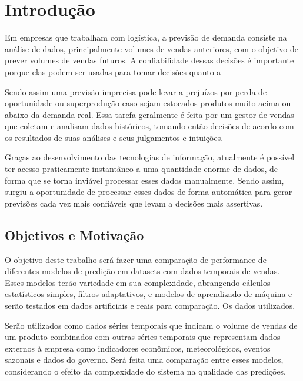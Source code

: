 
\chapter[Introdução]{Introdução}

Em empresas que trabalham com logística, a previsão de demanda consiste na análise de dados, principalmente volumes de vendas anteriores, com o objetivo de prever volumes de vendas futuros. A confiabilidade dessas decisões é importante porque elas podem ser usadas para tomar decisões quanto a 

Sendo assim uma previsão imprecisa pode levar a prejuízos por perda de oportunidade ou superprodução caso sejam estocados produtos muito acima ou abaixo da demanda real. Essa tarefa geralmente é feita por um gestor de vendas que coletam e analisam dados históricos, tomando então decisões de acordo com os resultados de suas análises e seus julgamentos e intuições.

Graças ao desenvolvimento das tecnologias de informação, atualmente é possível ter acesso praticamente instantâneo a uma quantidade enorme de dados, de forma que se torna inviável processar esses dados manualmente. Sendo assim, surgiu a oportunidade de processar esses dados de forma automática para gerar previsões cada vez mais confiáveis que levam a decisões mais assertivas.

\section{Objetivos e Motivação}

O objetivo deste trabalho será fazer uma comparação de performance de diferentes modelos de predição em datasets com dados temporais de vendas. Esses modelos terão variedade em sua complexidade, abrangendo cálculos estatísticos simples, filtros adaptativos, e modelos de aprendizado de máquina e serão testados em dados artificiais e reais para comparação. Os dados utilizados.

Serão utilizados como dados séries temporais que indicam o volume de vendas de um produto combinados com outras séries temporais que representam dados externos à empresa como indicadores econômicos, meteorológicos, eventos sazonais e dados do governo. Será feita uma comparação entre esses modelos, considerando o efeito da complexidade do sistema na qualidade das predições.